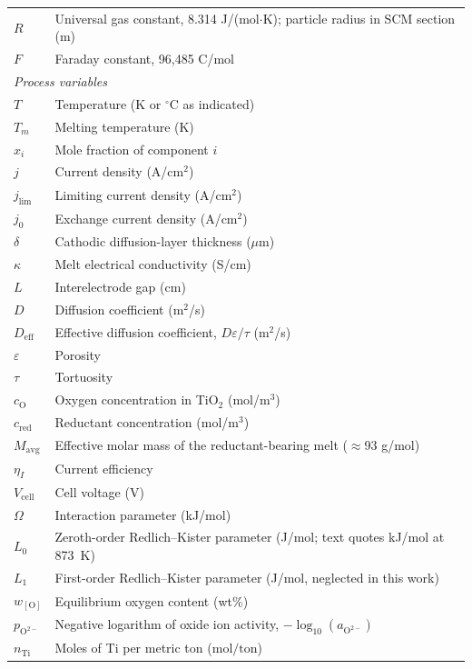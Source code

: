\documentclass[pdflatex,sn-basic,Numbered]{sn-jnl}
\begin{document}
\begin{tabular}{ll}
$R$ & Universal gas constant, 8.314 J/(mol$\cdot$K); particle radius in SCM section (m) \\
$F$ & Faraday constant, 96{,}485 C/mol \\
\multicolumn{2}{l}{\textit{Process variables}} \\
$T$ & Temperature (K or $^{\circ}$C as indicated) \\
$T_m$ & Melting temperature (K) \\
$x_i$ & Mole fraction of component $i$ \\
$j$ & Current density (A/cm$^2$) \\
$j_{\mathrm{lim}}$ & Limiting current density (A/cm$^2$) \\
$j_0$ & Exchange current density (A/cm$^2$) \\
$\delta$ & Cathodic diffusion-layer thickness ($\mu$m) \\
$\kappa$ & Melt electrical conductivity (S/cm) \\
$L$ & Interelectrode gap (cm) \\
$D$ & Diffusion coefficient (m$^2$/s) \\
$D_{\mathrm{eff}}$ & Effective diffusion coefficient, $D\varepsilon/\tau$ (m$^2$/s) \\
$\varepsilon$ & Porosity \\
$\tau$ & Tortuosity \\
$c_{\mathrm{O}}$ & Oxygen concentration in TiO$_2$ (mol/m$^3$) \\
$c_{\mathrm{red}}$ & Reductant concentration (mol/m$^3$) \\
$M_{\mathrm{avg}}$ & Effective molar mass of the reductant-bearing melt ($\approx$93 g/mol) \\
$\eta_I$ & Current efficiency \\
$V_{\mathrm{cell}}$ & Cell voltage (V) \\
$\Omega$ & Interaction parameter (kJ/mol) \\
$L_0$ & Zeroth-order Redlich--Kister parameter (J/mol; text quotes kJ/mol at 873~K) \\
$L_1$ & First-order Redlich--Kister parameter (J/mol, neglected in this work) \\
$w_{[\mathrm{O}]}$ & Equilibrium oxygen content (wt\%) \\
$p_{\mathrm{O}^{2-}}$ & Negative logarithm of oxide ion activity, $-\log_{10}(a_{\mathrm{O}^{2-}})$ \\
$n_{\mathrm{Ti}}$ & Moles of Ti per metric ton ($\mathrm{mol/ton}$) \\
\end{tabular}
\end{document}
